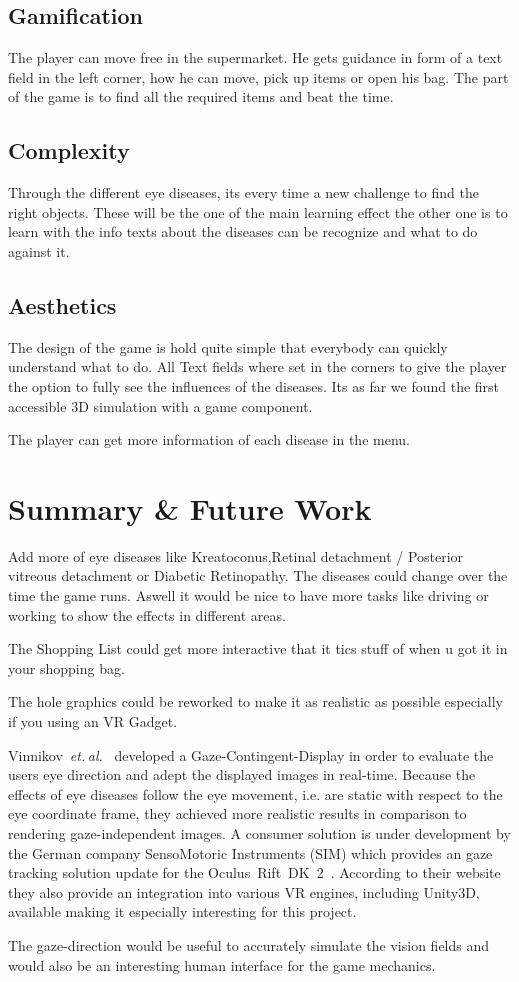 \documentclass{sig-alternate-05-2015}
\newcommand{\etal}{\textit{et. al.}}
\begin{document}
\subsection{Gamification}

The player can move free in the supermarket. He gets guidance in form of a text field in the left corner, how he can move, pick up items or open his bag. The part of the game is to find all the required items and beat the time.

\subsection{Complexity}

Through the different eye diseases, its every time a new challenge to find the right objects. These will be the one of the main learning effect the other one is to learn with the info texts about the diseases can be recognize and what to do against it.

\subsection{Aesthetics}

The design of the game is hold quite simple that everybody can quickly understand what to do. All Text fields where set in the corners to give the player the option to fully see the influences of the diseases. Its as far we found the first accessible 3D simulation with a game component.

The player can get more information of each disease in the menu.

%
%
\section{Summary \& Future Work}

Add more of eye diseases like Kreatoconus,Retinal detachment / Posterior vitreous detachment or Diabetic Retinopathy. The diseases could change over the time the game runs. Aswell it would be nice to have more tasks like driving or working to show the effects in different areas.

The Shopping List could get more interactive that it tics stuff of when u got it in your shopping bag.

The hole graphics could be reworked to make it as realistic as possible especially if you using an VR Gadget.

Vinnikov \etal \cite{gazedisplays} developed a Gaze-Contingent-Display in order to evaluate the users eye direction and adept the displayed images in real-time.
Because the effects of eye diseases follow the eye movement, i.e. are static with respect to the eye coordinate frame, they achieved more realistic results in comparison to rendering gaze-independent images.
A consumer solution is under development by the German company SensoMotoric Instruments (SIM) which provides an gaze tracking solution update for the Oculus Rift DK 2 \cite{smi-oculus, arstechoculus}.
According to their website they also provide an integration into various VR engines, including Unity3D, available making it especially interesting for this project.

The gaze-direction would be useful to accurately simulate the vision fields and would also be an interesting human interface for the game mechanics.
%
\printbibliography

\balancecolumns
\end{document}
